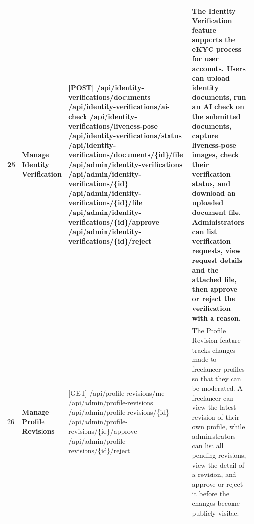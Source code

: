 \begin{longtable}{|C{0.7cm}|L{2.6cm}|S{6.6cm}|L{5.2cm}|}
25
&
\textbf{Manage Identity Verification}
&
[POST] /\allowbreak{}api/\allowbreak{}identity-verifications/\allowbreak{}documents \newline
[POST] /\allowbreak{}api/\allowbreak{}identity-verifications/\allowbreak{}ai-check \newline
[POST] /\allowbreak{}api/\allowbreak{}identity-verifications/\allowbreak{}liveness-pose \newline
[GET] /\allowbreak{}api/\allowbreak{}identity-verifications/\allowbreak{}status \newline
[GET] /\allowbreak{}api/\allowbreak{}identity-verifications/\allowbreak{}documents/\allowbreak{}\{id\}/\allowbreak{}file \newline
[GET] /\allowbreak{}api/\allowbreak{}admin/\allowbreak{}identity-verifications \newline
[GET] /\allowbreak{}api/\allowbreak{}admin/\allowbreak{}identity-verifications/\allowbreak{}\{id\} \newline
[GET] /\allowbreak{}api/\allowbreak{}admin/\allowbreak{}identity-verifications/\allowbreak{}\{id\}/\allowbreak{}file \newline
[PATCH] /\allowbreak{}api/\allowbreak{}admin/\allowbreak{}identity-verifications/\allowbreak{}\{id\}/\allowbreak{}approve \newline
[PATCH] /\allowbreak{}api/\allowbreak{}admin/\allowbreak{}identity-verifications/\allowbreak{}\{id\}/\allowbreak{}reject
&
The Identity Verification feature supports the eKYC process for user accounts. Users can upload identity documents, run an AI check on the submitted documents, capture liveness-pose images, check their verification status, and download an uploaded document file. Administrators can list verification requests, view request details and the attached file, then approve or reject the verification with a reason.
\\ \hline

26
&
\textbf{Manage Profile Revisions}
&
[GET] /\allowbreak{}api/\allowbreak{}profile-revisions/\allowbreak{}me \newline
[GET] /\allowbreak{}api/\allowbreak{}admin/\allowbreak{}profile-revisions \newline
[GET] /\allowbreak{}api/\allowbreak{}admin/\allowbreak{}profile-revisions/\allowbreak{}\{id\} \newline
[PATCH] /\allowbreak{}api/\allowbreak{}admin/\allowbreak{}profile-revisions/\allowbreak{}\{id\}/\allowbreak{}approve \newline
[PATCH] /\allowbreak{}api/\allowbreak{}admin/\allowbreak{}profile-revisions/\allowbreak{}\{id\}/\allowbreak{}reject
&
The Profile Revision feature tracks changes made to freelancer profiles so that they can be moderated. A freelancer can view the latest revision of their own profile, while administrators can list all pending revisions, view the detail of a revision, and approve or reject it before the changes become publicly visible.
\\ \hline


\end{longtable}
